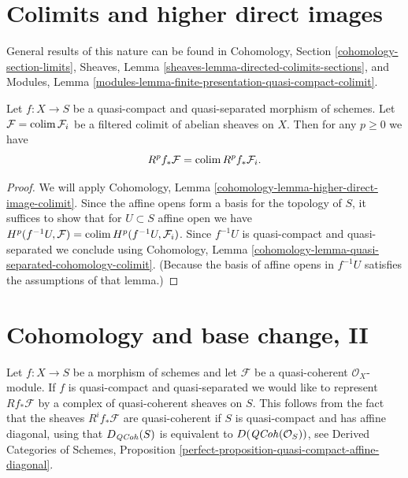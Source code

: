 \section{Colimits and higher direct images}
\label{section-colimits}

\noindent
General results of this nature can be found in
Cohomology, Section \ref{cohomology-section-limits},
Sheaves, Lemma \ref{sheaves-lemma-directed-colimits-sections}, and
Modules, Lemma \ref{modules-lemma-finite-presentation-quasi-compact-colimit}.

\begin{lemma}
\label{lemma-colimit-cohomology}
Let $f : X \to S$ be a quasi-compact and quasi-separated morphism of schemes.
Let $\mathcal{F} = \mathop{\mathrm{colim}}\nolimits \mathcal{F}_i$ be a filtered colimit
of abelian sheaves on $X$. Then for any $p \geq 0$ we have
$$
R^pf_*\mathcal{F} = \mathop{\mathrm{colim}}\nolimits R^pf_*\mathcal{F}_i.
$$
\end{lemma}

\begin{proof}
We will apply Cohomology, Lemma
\ref{cohomology-lemma-higher-direct-image-colimit}.
Since the affine opens form a basis for the topology of $S$,
it suffices to show that for $U \subset S$ affine open we have
$H^p(f^{-1}U, \mathcal{F}) = \mathop{\mathrm{colim}}\nolimits H^p(f^{-1}U, \mathcal{F}_i)$.
Since $f^{-1}U$ is quasi-compact and quasi-separated we conclude
using
Cohomology, Lemma \ref{cohomology-lemma-quasi-separated-cohomology-colimit}.
(Because the basis of affine opens in $f^{-1}U$
satisfies the assumptions of that lemma.)
\end{proof}










\section{Cohomology and base change, II}
\label{section-cohomology-and-base-change-derived}

\noindent
Let $f : X \to S$ be a morphism of schemes and let $\mathcal{F}$
be a quasi-coherent $\mathcal{O}_X$-module. If $f$ is quasi-compact
and quasi-separated we would like to represent $Rf_*\mathcal{F}$
by a complex of quasi-coherent sheaves on $S$. This follows
from the fact that the sheaves $R^if_*\mathcal{F}$ are quasi-coherent
if $S$ is quasi-compact and has affine diagonal,
using that $D_{\mathit{QCoh}}(S)$ is equivalent to
$D(\mathit{QCoh}(\mathcal{O}_S))$, see
Derived Categories of Schemes, Proposition
\ref{perfect-proposition-quasi-compact-affine-diagonal}.


